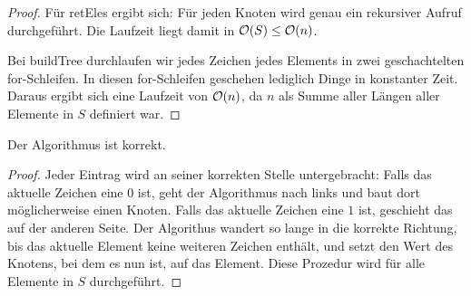 \documentclass{scrartcl} %
\begin{document}
\begin{aufgabe}
\begin{proof}
            Für {\ttfamily retEles} ergibt sich: Für jeden Knoten wird genau ein rekursiver Aufruf durchgeführt. Die Laufzeit liegt damit in $\operatorname{\mathcal{O}}(S) \leq \operatorname{\mathcal{O}}(n)$.

            Bei {\ttfamily buildTree} durchlaufen wir jedes Zeichen jedes Elements in zwei geschachtelten {\ttfamily for}-Schleifen. In diesen {\ttfamily for}-Schleifen geschehen lediglich Dinge in konstanter Zeit. Daraus ergibt sich eine Laufzeit von $\operatorname{\mathcal{O}}(n)$, da $n$ als Summe aller Längen aller Elemente in $S$ definiert war. 
        \end{proof}
        \begin{theorem*}
            Der Algorithmus ist korrekt.
        \end{theorem*}
        \begin{proof}
            Jeder Eintrag wird an seiner korrekten Stelle untergebracht: Falls das aktuelle Zeichen eine $0$ ist, geht der Algorithmus nach links und baut dort möglicherweise einen Knoten. Falls das aktuelle Zeichen eine $1$ ist, geschieht das auf der anderen Seite. Der Algorithus wandert so lange in die korrekte Richtung, bis das aktuelle Element keine weiteren Zeichen enthält, und setzt den Wert des Knotens, bei dem es nun ist, auf das Element. Diese Prozedur wird für alle Elemente in $S$ durchgeführt.
        \end{proof}
    \end{aufgabe}
\end{document}
